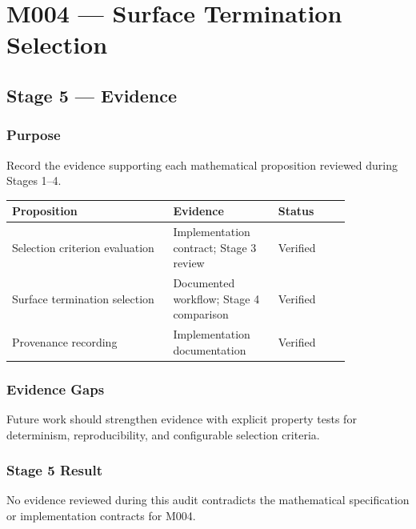\chapter{M004 --- Surface Termination Selection}

\section{Stage 5 --- Evidence}

\subsection{Purpose}

Record the evidence supporting each mathematical proposition reviewed
during Stages 1--4.

\begin{center}
\begin{tabular}{|p{0.40\linewidth}|p{0.26\linewidth}|p{0.18\linewidth}|}
\hline
Proposition & Evidence & Status\\
\hline
Selection criterion evaluation & Implementation contract; Stage 3 review & Verified\\
Surface termination selection & Documented workflow; Stage 4 comparison & Verified\\
Provenance recording & Implementation documentation & Verified\\
\hline
\end{tabular}
\end{center}

\subsection{Evidence Gaps}

Future work should strengthen evidence with explicit property tests for
determinism, reproducibility, and configurable selection criteria.

\subsection{Stage 5 Result}

No evidence reviewed during this audit contradicts the mathematical
specification or implementation contracts for M004.

